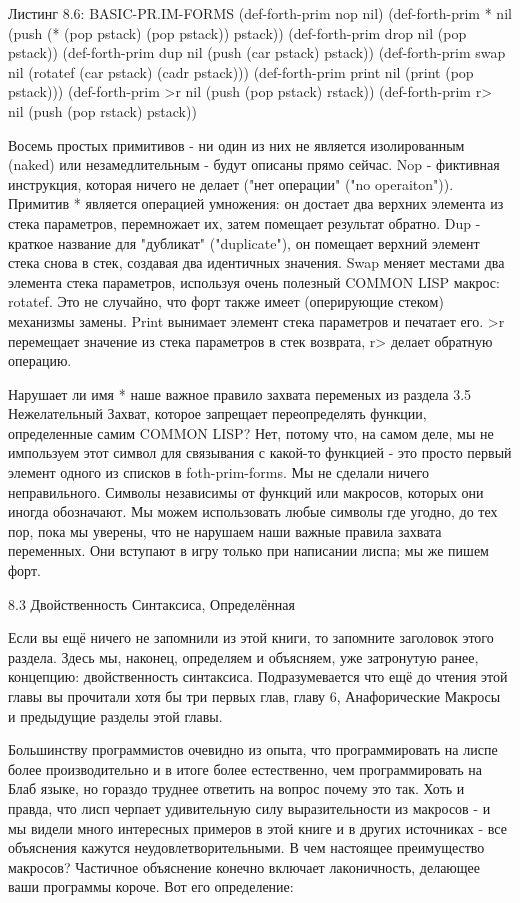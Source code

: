 Листинг 8.6: BASIC-PR.IM-FORMS
(def-forth-prim nop nil)
(def-forth-prim * nil
(push (* (pop pstack) (pop pstack))
pstack))
(def-forth-prim drop nil
(pop pstack))
(def-forth-prim dup nil
(push (car pstack) pstack))
(def-forth-prim swap nil
(rotatef (car pstack) (cadr pstack)))
(def-forth-prim print nil
(print (pop pstack)))
(def-forth-prim >r nil
(push (pop pstack) rstack))
(def-forth-prim r> nil
(push (pop rstack) pstack)) 

Восемь простых примитивов - ни один из них не является изолированным (naked) или незамедлительным - будут описаны прямо сейчас. Nop - фиктивная инструкция, которая ничего не делает ("нет операции" ("no operaiton")). Примитив * является операцией умножения: он достает два верхних элемента из стека параметров, перемножает их, затем помещает результат обратно. Dup - краткое название для "дубликат" ("duplicate"), он помещает верхний элемент стека снова в стек, создавая два идентичных значения. Swap меняет местами два элемента стека параметров, используя очень полезный COMMON LISP макрос: rotatef. Это не случайно, что форт также имеет (оперирующие стеком) механизмы замены. Print вынимает элемент стека параметров и печатает его. >r перемещает значение из стека параметров в стек возврата, r> делает обратную операцию.

Нарушает ли имя * наше важное правило захвата переменых из раздела 3.5 Нежелательный Захват, которое запрещает переопределять функции, определенные самим COMMON LISP? Нет, потому что, на самом деле, мы не импользуем этот символ для связывания с какой-то функцией - это просто первый элемент одного из списков в foth-prim-forms. Мы не сделали ничего неправильного. Символы независимы от функций или макросов, которых они иногда обозначают. Мы можем использовать любые символы где угодно, до тех пор, пока мы уверены, что не нарушаем наши важные правила захвата переменных. Они вступают в игру только при написании лиспа; мы же пишем форт.

8.3 Двойственность Синтаксиса, Определённая

Если вы ещё ничего не запомнили из этой книги, то запомните заголовок этого раздела. Здесь мы, наконец, определяем и объясняем, уже затронутую ранее, концепцию: двойственность синтаксиса. Подразумевается что ещё до чтения этой главы вы прочитали хотя бы три первых глав, главу 6, Анафорические Макросы и предыдущие разделы этой главы.

Большинству программистов очевидно из опыта, что программировать на лиспе более производительно и в итоге более естественно, чем программировать на Блаб языке, но гораздо труднее ответить на вопрос почему это так. Хоть и правда, что лисп черпает удивительную силу выразительности из макросов - и мы видели много интересных примеров в этой книге и в других источниках - все объяснения кажутся неудовлетворительными. В чем настоящее преимущество макросов? Частичное объяснение конечно включает лаконичность, делающее ваши программы короче. Вот его определение:


